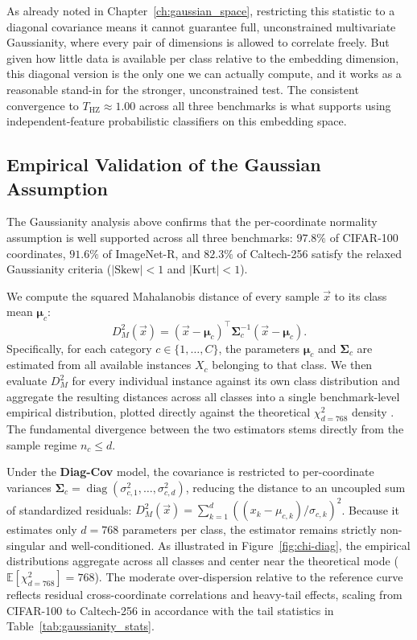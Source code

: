 As already noted in Chapter~\ref{ch:gaussian_space}, restricting this statistic to a diagonal covariance means it cannot guarantee full, unconstrained multivariate Gaussianity, where every pair of dimensions is allowed to correlate freely. But given how little data is available per class relative to the embedding dimension, this diagonal version is the only one we can actually compute, and it works as a reasonable stand-in for the stronger, unconstrained test. The consistent convergence to $T_{\mathrm{HZ}} \approx 1.00$ across all three benchmarks is what supports using independent-feature probabilistic classifiers on this embedding space.

\subsection{Empirical Validation of the Gaussian Assumption}
\label{sec:an:gauss}

The Gaussianity analysis above confirms that the per-coordinate normality assumption is well supported across all three benchmarks: $97.8\%$ of CIFAR-100 coordinates, $91.6\%$ of ImageNet-R, and $82.3\%$ of Caltech-256 satisfy the relaxed Gaussianity criteria ($|\text{Skew}| < 1$ and $|\text{Kurt}| < 1$). 

We compute the squared Mahalanobis distance of every sample $\vec{x}$ to its class mean $\boldsymbol{\mu}_c$:
\begin{equation}
	D_M^2(\vec{x}) = (\vec{x} - \boldsymbol{\mu}_c)^\top \boldsymbol{\Sigma}_c^{-1} (\vec{x} - \boldsymbol{\mu}_c).
\end{equation}
Specifically, for each category $c \in \{1, \dots, C\}$, the parameters $\boldsymbol{\mu}_c$ and $\boldsymbol{\Sigma}_c$ are estimated from all available instances $X_c$ belonging to that class. We then evaluate $D_M^2$ for every individual instance against its own class distribution and aggregate the resulting distances across all classes into a single benchmark-level empirical distribution, plotted directly against the theoretical $\chi^2_{d=768}$ density \cite{pearson1895skewness}. The fundamental divergence between the two estimators stems directly from the sample regime $n_c \leq d$.

Under the \textbf{Diag-Cov} model, the covariance is restricted to per-coordinate variances $\boldsymbol{\Sigma}_c = \operatorname{diag}(\sigma_{c,1}^2, \dots, \sigma_{c,d}^2)$, reducing the distance to an uncoupled sum of standardized residuals: $D_M^2(\vec{x}) = \sum_{k=1}^{d} ((x_k - \mu_{c,k})/\sigma_{c,k})^2$. Because it estimates only $d = 768$ parameters per class, the estimator remains strictly non-singular and well-conditioned. As illustrated in Figure~\ref{fig:chi-diag}, the empirical distributions aggregate across all classes and center near the theoretical mode ($\mathbb{E}[\chi^2_{d=768}] = 768$). The moderate over-dispersion relative to the reference curve reflects residual cross-coordinate correlations and heavy-tail effects, scaling from CIFAR-100 to Caltech-256 in accordance with the tail statistics in Table~\ref{tab:gaussianity_stats}.

